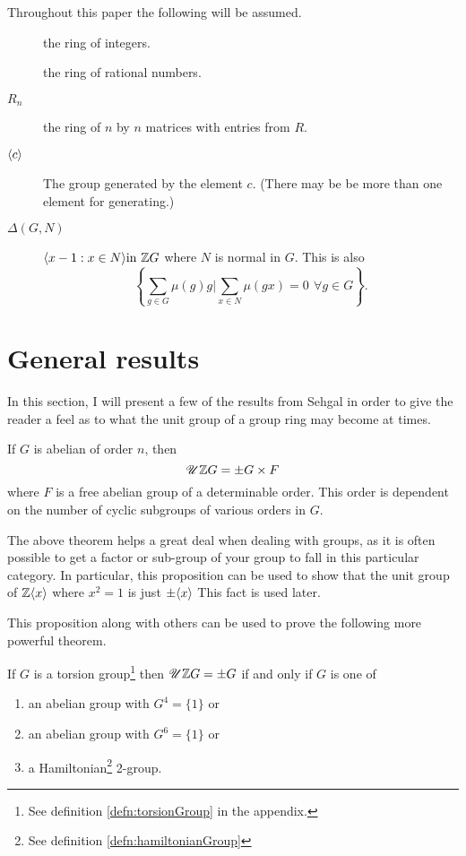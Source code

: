 \documentclass[11pt]{report}
\begin{document}
Throughout this paper the following will be assumed.
\begin{description}
\item[\integers{}] the ring of integers.
\item[\rat] the ring of rational numbers.
\item[\( R_n \)] the ring of \(n\) by \(n\) matrices with entries from \(R\).
\item[\(\langle c \rangle \)] The group generated by the element \(c\).  (There may be be more than one element 
for generating.)
\item[\(\Delta (G,N)\)] \(\ggen{x-1 : x \in N} \mathrm{ in }\ \integers G\) where $N$ 
is normal in $G$. This is also \[\left\{\sum_{g \in G} \mu(g)g 
 | \sum_{x \in N} \mu(gx) = 0\,\  \forall  g \in G\right\}.\]
\end{description}

\section{General results}

In this section, I will present a few of the results from Sehgal \cite{bib:sehgal78} in order to give the reader a
feel as to what the unit group of a group ring may become at times.

\begin{proposition}

If $G$ is abelian of order $n$, then \[\mathscr{U} \mathbb{Z}{}G = \pm{}G\times F\] where $F$ is a
free abelian group of a determinable order. This order is dependent on the number of cyclic
subgroups of various orders in $G$.
\end{proposition}

The above theorem helps a great deal when dealing with groups, as it is often possible to get a
factor or sub-group of your group to fall in this particular category. In particular, this
proposition can be used to show that the unit group of \( \mathbb{Z}{}\langle x \rangle\) where \(x^2=1\) is just
\(\pm{}\langle x \rangle\) This fact is used later.

This proposition along with others can be used to prove the following more powerful theorem.


\begin{theorem}

If $G$ is a torsion group\footnote{See definition \ref{defn:torsionGroup} in the appendix.} then \(\mathscr{U} \mathbb{Z}{}G = \pm{}G\) if and only if $G$ is one of
\begin{enumerate}
\item an abelian group with \(G^4 = \{1\}\) or
\item an abelian group with \(G^6 = \{1\}\) or
\item a Hamiltonian\footnote{See definition \ref{defn:hamiltonianGroup}}
 2-group.
\end{enumerate}
\end{theorem}
\end{document}
